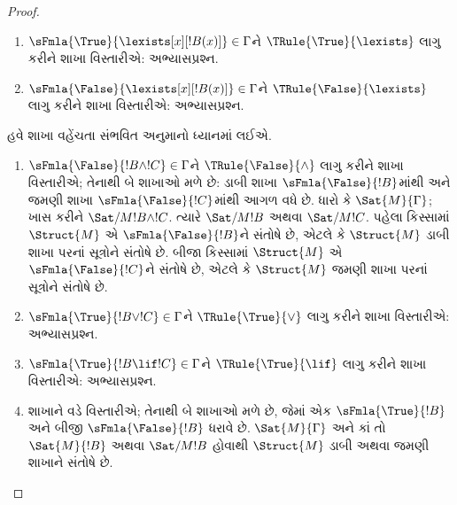 \begin{proof}
\begin{enumerate}
   મુજબ
  $\Sat/{M}{\lforall[x][!A(x)]}$ જો અને માત્ર જો કોઈ $s$ માટે
  $\Sat/{M}{!A(x)}[s]$. હવે $\Struct{M'}$ એ $\Struct{M}$ જેવી જ હોય,
  સિવાય કે $\Assign{a}{M'} = s(x)$. $a$ એ~$\Gamma$માં આવતો ન હોવાથી
   મુજબ કોઈ પણ
  $\sFmla{\True}{!C} \in \Gamma$ માટે $\Sat{M'}{!C}$ અને કોઈ પણ
  $\sFmla{\False}{!C} \in \Gamma$ માટે $\Sat/{M'}{!C}$.

   મુજબ
  $\Sat/{M'}{!A(x)}[s]$.  મુજબ
  $\Sat/{M'}{!A(a)}[s]$. $!A(a)$ વાક્ય હોવાથી
   મુજબ $\Sat/{M'}{!A(a)}$;
  એટલે કે $\Struct{M'}$ એ $\sFmla{\False}{!A(a)}$ને સંતોષે છે.
\item $\sFmla{\True}{\lexists[x][!B(x)]} \in \Gamma$ને
  $\TRule{\True}{\lexists}$ લાગુ કરીને શાખા વિસ્તારીએ: અભ્યાસપ્રશ્ન.
\item $\sFmla{\False}{\lexists[x][!B(x)]} \in \Gamma$ને
  $\TRule{\False}{\lexists}$ લાગુ કરીને શાખા વિસ્તારીએ: અભ્યાસપ્રશ્ન.
\end{enumerate}
હવે શાખા વહેંચતા સંભવિત અનુમાનો ધ્યાનમાં લઈએ.
\begin{enumerate}
\item $\sFmla{\False}{!B \land !C} \in \Gamma$ને
  $\TRule{\False}{\land}$ લાગુ કરીને શાખા વિસ્તારીએ; તેનાથી બે શાખાઓ
  મળે છે: ડાબી શાખા $\sFmla{\False}{!B}$માંથી અને જમણી શાખા
  $\sFmla{\False}{!C}$માંથી આગળ વધે છે. ધારો કે
  $\Sat{M}{\Gamma}$; ખાસ કરીને
  $\Sat/{M}{!B \land !C}$. ત્યારે
  $\Sat/{M}{!B}$ અથવા
  $\Sat/{M}{!C}$. પહેલા કિસ્સામાં
  $\Struct{M}$ એ
  $\sFmla{\False}{!B}$ને સંતોષે છે, એટલે કે
  $\Struct{M}$ ડાબી શાખા પરનાં સૂત્રોને
  સંતોષે છે. બીજા કિસ્સામાં $\Struct{M}$ એ
  $\sFmla{\False}{!C}$ને સંતોષે છે, એટલે કે
  $\Struct{M}$ જમણી શાખા પરનાં સૂત્રોને
  સંતોષે છે.
\item $\sFmla{\True}{!B \lor !C} \in \Gamma$ને
  $\TRule{\True}{\lor}$ લાગુ કરીને શાખા વિસ્તારીએ: અભ્યાસપ્રશ્ન.
\item $\sFmla{\True}{!B \lif !C} \in \Gamma$ને
  $\TRule{\True}{\lif}$ લાગુ કરીને શાખા વિસ્તારીએ: અભ્યાસપ્રશ્ન.
\item શાખાને \Cut વડે વિસ્તારીએ; તેનાથી બે શાખાઓ મળે છે, જેમાં એક
  $\sFmla{\True}{!B}$ અને બીજી $\sFmla{\False}{!B}$ ધરાવે છે.
  $\Sat{M}{\Gamma}$ અને કાં તો
  $\Sat{M}{!B}$ અથવા
  $\Sat/{M}{!B}$ હોવાથી
  $\Struct{M}$ ડાબી અથવા જમણી શાખાને સંતોષે છે.
\end{enumerate}
\end{proof}


